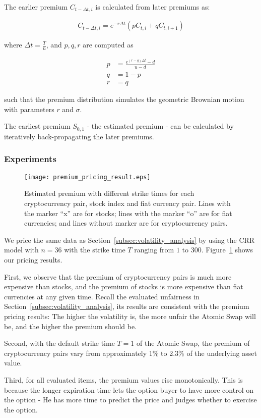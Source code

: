 The earlier premium $C_{t - \Delta t, i}$ is calculated from later premiums as:

\begin{align}
C_{t - \Delta t, i} = e^{-r \Delta t} (p C_{t, i} + q C_{t, i+1})
\end{align}

where $\Delta t = \frac{T}{n}$, and $p, q, r$ are computed as

\begin{align} 
p &= \frac{e^{(r-q)\Delta t} - d}{u - d}\\
q &= 1 - p\\
r &= q
\end{align}

such that the premium distribution simulates the geometric Brownian motion with parameters $r$ and $\sigma$.

The earliest premium $S_{0, 1}$ - the estimated premium - can be calculated by iteratively back-propagating the later premiums. 


\subsubsection{Experiments}


\begin{figure}
    \texttt{[image: premium\_pricing\_result.eps]}
    \caption{Estimated premium with different strike times for each cryptocurrency pair, stock index and fiat currency pair. Lines with the marker ``x'' are for stocks; lines with the marker ``o'' are for fiat currencies; and lines without marker are for cryptocurrency pairs.}
    \label{fig:premium_pricing_result}
\end{figure}

We price the same data as Section~\ref{subsec:volatility_analysis} by using the CRR model with $n = 36$ with the strike time $T$ ranging from $1$ to $300$.
Figure~\ref{fig:premium_pricing_result} shows our pricing results.

First, we observe that the premium of cryptocurrency pairs is much more expensive than stocks, and the premium of stocks is more expensive than fiat currencies at any given time.
Recall the evaluated unfairness in Section~\ref{subsec:volatility_analysis}, its results are consistent with the premium pricing results: The higher the volatility is, the more unfair the Atomic Swap will be, and the higher the premium should be.

Second, with the default strike time $T = 1$ of the Atomic Swap, the premium of cryptocurrency pairs vary from approximately 1\% to 2.3\% of the underlying asset value.

Third, for all evaluated items, the premium values rise monotonically.
This is because the longer expiration time lets the option buyer to have more control on the option - He has more time to predict the price and judges whether to exercise the option.